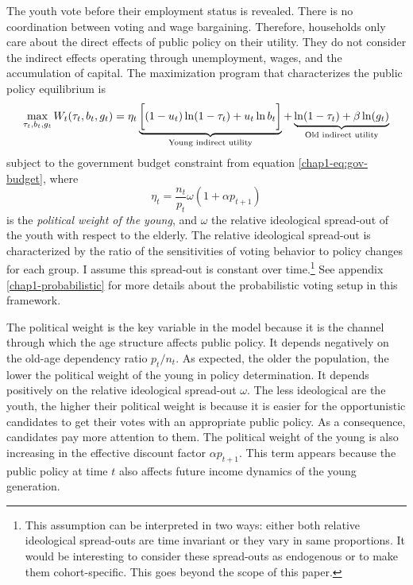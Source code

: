 The youth vote before their employment status is revealed. There is no coordination between voting and wage bargaining. Therefore, households only care about the direct effects of public policy on their utility. They do not consider the indirect effects operating through unemployment, wages, and the accumulation of capital.
The maximization program that characterizes the public policy equilibrium is
\begin{equation*}
	\max_{\tau_t, b_t, g_t} W_t(\tau_t, b_t, g_t) = \eta_t \begingroup
    \underbrace{\bigg[ (1-u_t)\ln(1-\tau_t) + u_t \ln b_t\bigg]}_\text{Young indirect utility}\endgroup  + \begingroup
    \underbrace{\ln(1-\tau_t) + \beta \ln(g_t)}_\text{Old indirect utility}\endgroup
\end{equation*}
subject to the government budget constraint from equation \eqref{chap1-eq:gov-budget}, where 
\begin{equation}\label{chap1-eq:eta}
	\eta_t = \frac{n_t}{p_t}\omega(1+\alpha p_{t+1})
\end{equation}
is the \textit{political weight of the young}, and $\omega$ the relative ideological spread-out of the youth with respect to the elderly. The relative ideological spread-out is characterized by the ratio of the sensitivities of voting behavior to policy changes for each group. I assume this spread-out is constant over time.\footnote{This assumption can be interpreted in two ways: either both relative ideological spread-outs are time invariant or they vary in same proportions. It would be interesting to consider these spread-outs as endogenous or to make them cohort-specific. This goes beyond the scope of this paper.} See appendix \ref{chap1-probabilistic} for  more details about the probabilistic voting setup in this framework.

The political weight is the key variable in the model because it is the channel through which the age structure affects public policy. It depends negatively on the old-age dependency ratio $p_t/n_t$. As expected, the older the population, the lower the political weight of the young in policy determination. It depends positively on the relative ideological spread-out $\omega$. The less ideological are the youth, the higher their political weight is because it is easier for the opportunistic candidates to get their votes with an appropriate public policy. As a consequence, candidates pay more attention to them. The political weight of the young is also increasing in the effective discount factor $\alpha p_{t+1}$. This term appears because the public policy at time $t$ also affects future income dynamics of the young generation.

